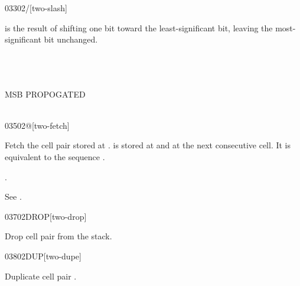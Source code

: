 \vspace*{-1ex}\enlargethispage{3ex}
\begin{worddef}{0330}{2/}[two-slash]
\item {}

	 is the result of shifting  one bit toward
	the least-significant bit, leaving the most-significant bit
	unchanged.

	\begin{testing} %
		 \\
		 \\
		 \\
		  MSB PROPOGATED \\
		 \\
	\end{testing}
\end{worddef}

\vspace*{-1ex}
\begin{worddef}{0350}{2@}[two-fetch]
\item {}

	Fetch the cell pair  stored at .
	 is stored at  and  at the
	next consecutive cell. It is equivalent to the sequence
	    .

	.

	\begin{testing} %
		See .
	\end{testing}
\end{worddef}

\vspace*{-1ex}
\begin{worddef}{0370}{2DROP}[two-drop]
\item {}

	Drop cell pair  from the stack.

	\begin{testing} %
	\end{testing}
\end{worddef}

\vspace*{-1ex}
\begin{worddef}{0380}{2DUP}[two-dupe]
\item {}

	Duplicate cell pair .

	\begin{testing} %
	\end{testing}
\end{worddef}


